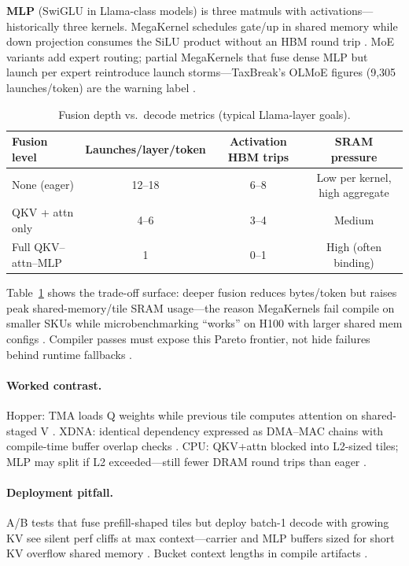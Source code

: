 \textbf{MLP} (SwiGLU in Llama-class models) is three matmuls with activations---historically three kernels. MegaKernel schedules gate/up in shared memory while down projection consumes the SiLU product without an HBM round trip \citep{patel2025llminference,liu2024deepseekv3}. MoE variants add expert routing; partial MegaKernels that fuse dense MLP but launch per expert reintroduce launch storms---TaxBreak's OLMoE figures (9,305 launches/token) are the warning label \citep{taxbreak2026,liu2024deepseekv3}.

\begin{table}[t]
\centering
\caption{Fusion depth vs.\ decode metrics (typical Llama-layer goals).}
\label{tab:qkv_fusion}
\begin{tabular}{lccc}
\toprule
\textbf{Fusion level} & \textbf{Launches/layer/token} & \textbf{Activation HBM trips} & \textbf{SRAM pressure} \\
\midrule
None (eager) & 12--18 & 6--8 & Low per kernel, high aggregate \\
QKV + attn only & 4--6 & 3--4 & Medium \\
Full QKV--attn--MLP & 1 & 0--1 & High (often binding) \\
\bottomrule
\end{tabular}
\end{table}

Table~\ref{tab:qkv_fusion} shows the trade-off surface: deeper fusion reduces bytes/token but raises peak shared-memory/tile SRAM usage---the reason MegaKernels fail compile on smaller SKUs while microbenchmarking ``works'' on H100 with larger shared mem configs \citep{nvidia2022hopper,amd2024aie}. Compiler passes must expose this Pareto frontier, not hide failures behind runtime fallbacks \citep{yirage2026,chen2020compilerbasedhardw}.

\paragraph{Worked contrast.} Hopper: TMA loads Q weights while previous tile computes attention on shared-staged V \citep{semianalysis2024tma}. XDNA: identical dependency expressed as DMA--MAC chains with compile-time buffer overlap checks \citep{amd2024aie}. CPU: QKV+attn blocked into L2-sized tiles; MLP may split if L2 exceeded---still fewer DRAM round trips than eager \citep{dlbook}.

\paragraph{Deployment pitfall.} A/B tests that fuse prefill-shaped tiles but deploy batch-1 decode with growing KV see silent perf cliffs at max context---carrier and MLP buffers sized for short KV overflow shared memory \citep{dao2023flashdecoding,memoryfloor2026}. Bucket context lengths in compile artifacts \citep{kwon2023vllm,yirage2026}.

